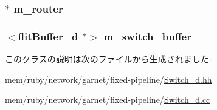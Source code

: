 \label{classSwitch__d_ab8b34c9f5479c61b8022de1aad185bae}
\hypertarget{classSwitch__d_a81d53a65b375007289068e764da769d8}{
\subsubsection[{m\_\-router}]{$\ast$ {\bf m\_\-router}}}
\label{classSwitch__d_a81d53a65b375007289068e764da769d8}
\hypertarget{classSwitch__d_ac37e8b09e57f852adbe0ff4022c63930}{
\subsubsection[{m\_\-switch\_\-buffer}]{$<${\bf flitBuffer\_\-d} $\ast$$>$ {\bf m\_\-switch\_\-buffer}}}
\label{classSwitch__d_ac37e8b09e57f852adbe0ff4022c63930}


このクラスの説明は次のファイルから生成されました:\begin{DoxyCompactItemize}
\item 
mem/ruby/network/garnet/fixed-\/pipeline/\hyperlink{Switch__d_8hh}{Switch\_\-d.hh}\item 
mem/ruby/network/garnet/fixed-\/pipeline/\hyperlink{Switch__d_8cc}{Switch\_\-d.cc}\end{DoxyCompactItemize}
